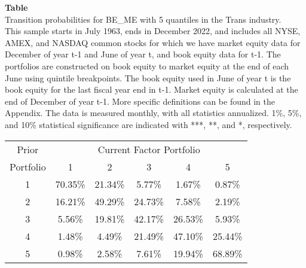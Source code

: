 \begin{table*}[ht!]
\raggedright
{}
\label{tab: transition_probs_BE_ME_Trans_with_5_quantiles}
\textbf{Table \thetable} \\
Transition probabilities for BE_ME with 5 quantiles in the Trans industry. \\
\hspace*{1em}This sample starts in July 1963, ends in December 2022, and includes all NYSE, AMEX, and NASDAQ common stocks for which we have market equity data for December of year t-1 and June of year t, and book equity data for t-1. The portfolios are constructed on book equity to market equity at the end of each June using quintile breakpoints.  The book equity used in June of year t is the book equity for the last fiscal year end in t-1.  Market equity is calculated at the end of December of year t-1.  More specific definitions can be found in the Appendix.  The data is measured monthly, with all statistics annualized.  1\%, 5\%, and 10\% statistical significance are indicated with ***, **, and *, respectively. \\
\vspace{0.5em}
\centering
\begin{adjustbox}{max width=\textwidth}
\begin{tabular}{@{}cccccc@{}}
\toprule
Prior & \multicolumn{5}{c}{Current Factor Portfolio} \\
Portfolio & 1 & 2 & 3 & 4 & 5 \\
\midrule
1 & 70.35\% & 21.34\% & 5.77\% & 1.67\% & 0.87\% \\
2 & 16.21\% & 49.29\% & 24.73\% & 7.58\% & 2.19\% \\
3 & 5.56\% & 19.81\% & 42.17\% & 26.53\% & 5.93\% \\
4 & 1.48\% & 4.49\% & 21.49\% & 47.10\% & 25.44\% \\
5 & 0.98\% & 2.58\% & 7.61\% & 19.94\% & 68.89\% \\
\bottomrule
\end{tabular}
\end{adjustbox}
\end{table*}